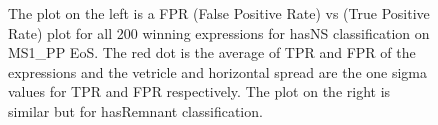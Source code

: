 \begin{figure}[htp]
  \centering
  \quad
  \caption{The plot on the left is a FPR (False Positive Rate) vs (True Positive Rate) plot for all 200 winning expressions for hasNS classification on MS1_PP EoS. The red dot is the average of TPR and FPR of the expressions and the vetricle and horizontal spread are the one sigma values for TPR and FPR respectively. The plot on the right is similar but for hasRemnant classification.  }
  \label{fig:FPR_TPR}
\end{figure}

